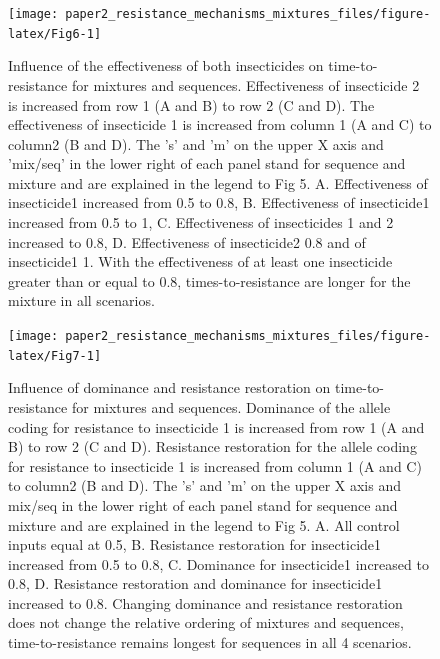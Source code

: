 \documentclass[11pt,]{article}
\begin{document}
\begin{figure}

\texttt{[image: paper2\_resistance\_mechanisms\_mixtures\_files/figure-latex/Fig6-1]} \hfill{}

\caption{Influence of the effectiveness of both insecticides on time-to-resistance for mixtures and sequences. Effectiveness of insecticide 2 is increased from row 1 (A and B) to row 2 (C and D). The effectiveness of insecticide 1 is increased from column 1 (A and C) to column2 (B and D). The 's' and 'm' on the upper X axis and 'mix/seq' in the lower right of each panel stand for sequence and mixture and are explained in the legend to Fig 5. A. Effectiveness of insecticide1 increased from 0.5 to 0.8, B. Effectiveness of insecticide1 increased from 0.5 to 1, C. Effectiveness of insecticides 1 and 2 increased to 0.8, D. Effectiveness of insecticide2 0.8 and of insecticide1 1. With the effectiveness of at least one insecticide greater than or equal to 0.8, times-to-resistance are longer for the mixture in all scenarios.}\label{fig:Fig6}
\end{figure}

\begin{figure}

\texttt{[image: paper2\_resistance\_mechanisms\_mixtures\_files/figure-latex/Fig7-1]} \hfill{}

\caption{Influence of dominance and resistance restoration on time-to-resistance for mixtures and sequences. Dominance of the allele coding for resistance to insecticide 1 is increased from row 1 (A and B) to row 2 (C and D). Resistance restoration for the allele coding for resistance to insecticide 1 is increased from column 1 (A and C) to column2 (B and D). The 's' and 'm' on the upper X axis and mix/seq in the lower right of each panel stand for sequence and mixture and are explained in the legend to Fig 5. A. All control inputs equal at 0.5, B. Resistance restoration for insecticide1 increased from 0.5 to 0.8, C. Dominance for insecticide1 increased to 0.8, D. Resistance restoration and dominance for insecticide1 increased to 0.8. Changing dominance and resistance restoration does not change the relative ordering of mixtures and sequences, time-to-resistance remains longest for sequences in all 4 scenarios.}\label{fig:Fig7}
\end{figure}
\end{document}
